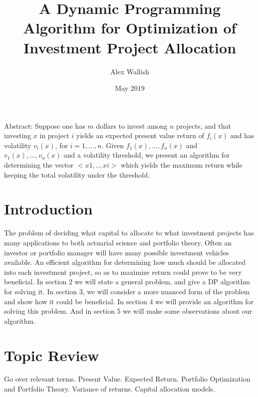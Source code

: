 \documentclass{article}
\title{A Dynamic Programming Algorithm for Optimization of Investment Project Allocation}
\author{Alex Wallish}
\date{May 2019}
\begin{document}
\maketitle

Abstract: 
Suppose one has $m$ dollars to invest among $n$ projects, and that investing $x$ in project $i$ yields an expected present value return of $f_{i}(x)$ and has volatility $v_{i}(x)$, for $ i = 1, ..., n. $ Given $f_{1}(x),...,f_{n}(x)$ and $v_{1}(x),...,v_{n}(x)$ and a volatility threshold, we present an algorithm for determining the vector $<x1,..,xi>$ which yields the maximum return while keeping the total volatility under the threshold.  



\pagebreak
\section{Introduction}
The problem of deciding what capital to allocate to what investment projects has many applications to both actuarial science and portfolio theory.  Often an investor or portfolio manager will have many possible investment vehicles available. An efficient algorithm for determining how much should be allocated into each investment project, so as to maximize return could prove to be very beneficial. In section 2 we will state a general problem, and give a DP algorithm for solving it.  In section 3, we will consider a more nuanced form of the problem and show how it could be beneficial.  In section 4 we will provide an algorithm for solving this problem.  And in section 5 we will make some observations about our algorithm. 

\section{Topic Review}
Go over relevant terms.  Present Value. Expected Return. Portfolio Optimization and Portfolio Theory.  Variance of returns.  Capital allocation models.  
\end{document}
